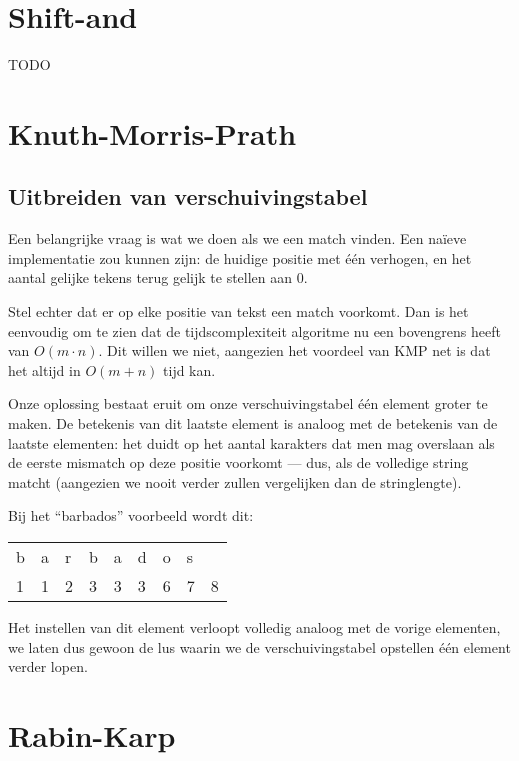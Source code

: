 \documentclass[a4paper,11pt]{article}
\begin{document}
\section{Shift-and}

TODO

\section{Knuth-Morris-Prath}

\subsection{Uitbreiden van verschuivingstabel}

Een belangrijke vraag is wat we doen als we een match vinden. Een na\"ieve
implementatie zou kunnen zijn: de huidige positie met \'e\'en verhogen, en het
aantal gelijke tekens terug gelijk te stellen aan 0.

Stel echter dat er op elke positie van tekst een match voorkomt. Dan is het
eenvoudig om te zien dat de tijdscomplexiteit algoritme nu een bovengrens heeft
van $O(m \cdot n)$. Dit willen we niet, aangezien het voordeel van KMP net is
dat het altijd in $O(m + n)$ tijd kan.

Onze oplossing bestaat eruit om onze verschuivingstabel \'e\'en element groter
te maken. De betekenis van dit laatste element is analoog met de betekenis van
de laatste elementen: het duidt op het aantal karakters dat men mag overslaan
als de eerste mismatch op deze positie voorkomt — dus, als de volledige string
matcht (aangezien we nooit verder zullen vergelijken dan de stringlengte).

Bij het “barbados” voorbeeld wordt dit:

\begin{center}
\begin{tabular}{lllllllll}
b & a & r & b & a & d & o & s &   \\
1 & 1 & 2 & 3 & 3 & 3 & 6 & 7 & 8 \\
\end{tabular}
\end{center}

Het instellen van dit element verloopt volledig analoog met de vorige elementen,
we laten dus gewoon de lus waarin we de verschuivingstabel opstellen \'e\'en
element verder lopen.

\section{Rabin-Karp}
\end{document}
